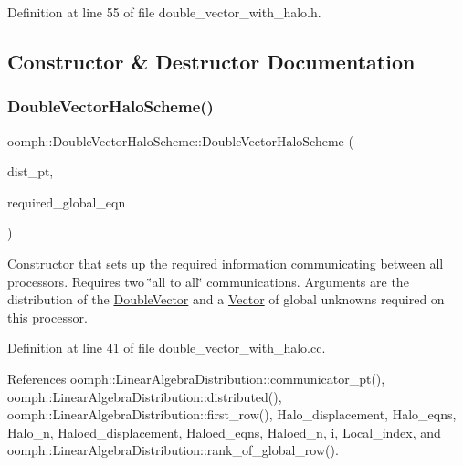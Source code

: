 Definition at line 55 of file double\+\_\+vector\+\_\+with\+\_\+halo.\+h.



\subsection{Constructor \& Destructor Documentation}
\mbox{\label{classoomph_1_1DoubleVectorHaloScheme_ac3809f5cac00b082a66bbf706087627e}} 
\subsubsection{\texorpdfstring{Double\+Vector\+Halo\+Scheme()}{DoubleVectorHaloScheme()}}
{\footnotesize\ttfamily oomph\+::\+Double\+Vector\+Halo\+Scheme\+::\+Double\+Vector\+Halo\+Scheme (\begin{DoxyParamCaption}\item[{\hyperlink{classoomph_1_1LinearAlgebraDistribution}{Linear\+Algebra\+Distribution} $\ast$const \&}]{dist\+\_\+pt,  }\item[{const \hyperlink{classoomph_1_1Vector}{Vector}$<$ unsigned $>$ \&}]{required\+\_\+global\+\_\+eqn }\end{DoxyParamCaption})}



Constructor that sets up the required information communicating between all processors. Requires two \char`\"{}all to all\char`\"{} communications. Arguments are the distribution of the \hyperlink{classoomph_1_1DoubleVector}{Double\+Vector} and a \hyperlink{classoomph_1_1Vector}{Vector} of global unknowns required on this processor. 



Definition at line 41 of file double\+\_\+vector\+\_\+with\+\_\+halo.\+cc.



References oomph\+::\+Linear\+Algebra\+Distribution\+::communicator\+\_\+pt(), oomph\+::\+Linear\+Algebra\+Distribution\+::distributed(), oomph\+::\+Linear\+Algebra\+Distribution\+::first\+\_\+row(), Halo\+\_\+displacement, Halo\+\_\+eqns, Halo\+\_\+n, Haloed\+\_\+displacement, Haloed\+\_\+eqns, Haloed\+\_\+n, i, Local\+\_\+index, and oomph\+::\+Linear\+Algebra\+Distribution\+::rank\+\_\+of\+\_\+global\+\_\+row().



